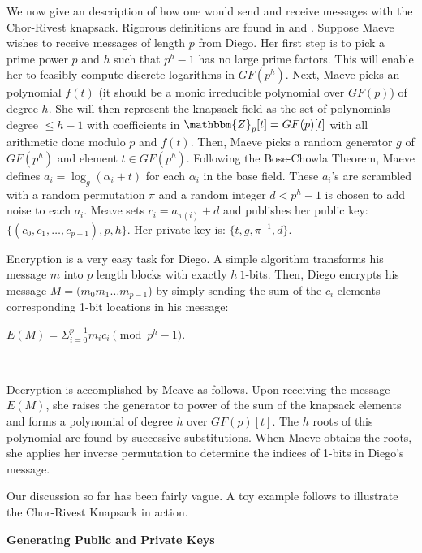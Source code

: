 \documentclass[12pt,a4paper,titlepage]{article}
\begin{document}
We now give an description of how one would send and receive messages with the Chor-Rivest knapsack. Rigorous definitions are found in \cite{Chor84:1} and \cite{hac:8}. Suppose Maeve wishes to receive messages of length $p$ from Diego. Her first step is to pick a prime power $p$ and $h$ such that $p^h - 1$ has no large prime factors. This will enable her to feasibly compute discrete logarithms in $GF(p^h)$. Next, Maeve picks an polynomial $f(t)$ (it should be a monic irreducible polynomial over $GF(p)$) of degree $h$. She will then represent the knapsack field as the set of polynomials degree $ \le h - 1$ with coefficients in $\mathbbm{Z}_p[t] = GF(p)[t]$ with all arithmetic done modulo $p$ and $f(t)$. Then, Maeve picks a random generator $g$ of $GF(p^h)$ and element $t \in GF(p^h)$. Following the Bose-Chowla Theorem, Maeve defines $a_i = \log_g (\alpha_i + t)$ for each $\alpha_i $ in the base field. These $a_i$'s are scrambled with a random permutation $\pi$ and a random integer $d < p^h - 1$ is chosen to add noise to each $a_i$. Meave sets $c_i = a_{\pi(i)} + d$ and publishes her public key: $\{ (c_0,c_1, \dots, c_{p-1}) , p, h \}$. Her private key is: $\{t,g,\pi^{-1},d\}$.
\\
\par Encryption is a very easy task for Diego. A simple algorithm transforms his message $m$ into $p$ length blocks with exactly $h \ 1$-bits. Then, Diego encrypts his message $M = (m_0 m_1 \dots m_{p-1}$) by simply sending the sum of the $c_i$ elements corresponding 1-bit locations in his message: \\ \centerline{$ E(M) = \Sigma_{i = 0}^{p-1} m_i c_i \pmod{p^h - 1} $.}
\\
\par Decryption is accomplished by Meave as follows. Upon receiving the message $E(M)$, she raises the generator to power of the sum of the knapsack elements and forms a polynomial of degree $h$ over $GF(p)[t]$. The $h$ roots of this polynomial are found by successive substitutions. When Maeve obtains the roots, she applies her inverse permutation to determine the indices of 1-bits in Diego's message. 
\\

\par Our discussion so far has been fairly vague. A toy example follows to illustrate the Chor-Rivest Knapsack in action. \newline

\textbf{Generating Public and Private Keys} 
\end{document}
